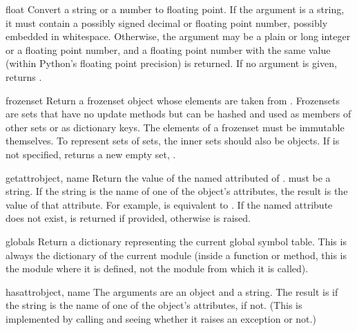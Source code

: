 \begin{funcdesc}{float}{}
  Convert a string or a number to floating point.  If the argument is a
  string, it must contain a possibly signed decimal or floating point
  number, possibly embedded in whitespace. Otherwise, the argument may be a plain
  or long integer or a floating point number, and a floating point
  number with the same value (within Python's floating point
  precision) is returned.  If no argument is given, returns .

\end{funcdesc}

\begin{funcdesc}{frozenset}{}
  Return a frozenset object whose elements are taken from .
  Frozensets are sets that have no update methods but can be hashed and
  used as members of other sets or as dictionary keys.  The elements of
  a frozenset must be immutable themselves.  To represent sets of sets,
  the inner sets should also be  objects.  If
   is not specified, returns a new empty set,
  .
\end{funcdesc}

\begin{funcdesc}{getattr}{object, name}
  Return the value of the named attributed of .  
  must be a string.  If the string is the name of one of the object's
  attributes, the result is the value of that attribute.  For example,
   is equivalent to .  If the
  named attribute does not exist,  is returned if provided,
  otherwise  is raised.
\end{funcdesc}

\begin{funcdesc}{globals}{}
  Return a dictionary representing the current global symbol table.
  This is always the dictionary of the current module (inside a
  function or method, this is the module where it is defined, not the
  module from which it is called).
\end{funcdesc}

\begin{funcdesc}{hasattr}{object, name}
  The arguments are an object and a string.  The result is  if the
  string is the name of one of the object's attributes,  if not.
  (This is implemented by calling  and seeing whether it raises an exception or not.)
\end{funcdesc}

